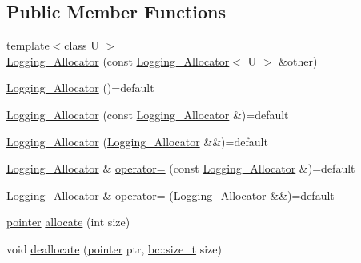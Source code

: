 \subsection*{Public Member Functions}
\begin{DoxyCompactItemize}
\item 
{\footnotesize template$<$class U $>$ }\\\hyperlink{structbc_1_1allocators_1_1Logging__Allocator_a8ac5909883585f7187d60b21cdd870c6}{Logging\+\_\+\+Allocator} (const \hyperlink{structbc_1_1allocators_1_1Logging__Allocator}{Logging\+\_\+\+Allocator}$<$ U $>$ \&other)
\item 
\hyperlink{structbc_1_1allocators_1_1Logging__Allocator_afbb758bbf6a7a81a11958d19bc7c5a43}{Logging\+\_\+\+Allocator} ()=default
\item 
\hyperlink{structbc_1_1allocators_1_1Logging__Allocator_aaa347dff3da29b3410e5d14e1db04d35}{Logging\+\_\+\+Allocator} (const \hyperlink{structbc_1_1allocators_1_1Logging__Allocator}{Logging\+\_\+\+Allocator} \&)=default
\item 
\hyperlink{structbc_1_1allocators_1_1Logging__Allocator_aa10a2fc90f25c0a8c50d3614859d88e0}{Logging\+\_\+\+Allocator} (\hyperlink{structbc_1_1allocators_1_1Logging__Allocator}{Logging\+\_\+\+Allocator} \&\&)=default
\item 
\hyperlink{structbc_1_1allocators_1_1Logging__Allocator}{Logging\+\_\+\+Allocator} \& \hyperlink{structbc_1_1allocators_1_1Logging__Allocator_a94222880c322c2f72483f036692efae8}{operator=} (const \hyperlink{structbc_1_1allocators_1_1Logging__Allocator}{Logging\+\_\+\+Allocator} \&)=default
\item 
\hyperlink{structbc_1_1allocators_1_1Logging__Allocator}{Logging\+\_\+\+Allocator} \& \hyperlink{structbc_1_1allocators_1_1Logging__Allocator_ae9674620f0f49481649359486c765b00}{operator=} (\hyperlink{structbc_1_1allocators_1_1Logging__Allocator}{Logging\+\_\+\+Allocator} \&\&)=default
\item 
\hyperlink{structbc_1_1allocators_1_1Allocator__Forwarder_ae9d48fbeb22a6686ad59128cf309d8bd}{pointer} \hyperlink{structbc_1_1allocators_1_1Logging__Allocator_ad2be32e15a233ea9aa8ea40fbed422f4}{allocate} (int size)
\item 
void \hyperlink{structbc_1_1allocators_1_1Logging__Allocator_a20f40b66932f9e0762a623ebac3415e2}{deallocate} (\hyperlink{structbc_1_1allocators_1_1Allocator__Forwarder_ae9d48fbeb22a6686ad59128cf309d8bd}{pointer} ptr, \hyperlink{namespacebc_aaf8e3fbf99b04b1b57c4f80c6f55d3c5}{bc\+::size\+\_\+t} size)
\end{DoxyCompactItemize}
